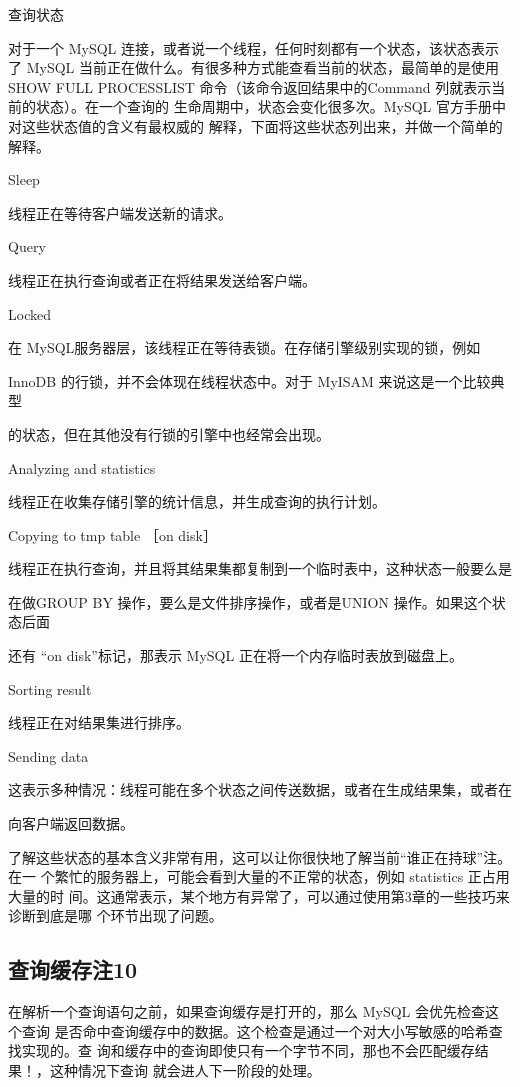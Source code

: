 查询状态

对于一个 MySQL 连接，或者说一个线程，任何时刻都有一个状态，该状态表示了
MySQL 当前正在做什么。有很多种方式能查看当前的状态，最简单的是使用 SHOW FULL
PROCESSLIST 命令（该命令返回结果中的Command 列就表示当前的状态）。在一个查询的
生命周期中，状态会变化很多次。MySQL 官方手册中对这些状态值的含义有最权威的
解释，下面将这些状态列出来，并做一个简单的解释。

Sleep

线程正在等待客户端发送新的请求。

Query

线程正在执行查询或者正在将结果发送给客户端。

Locked

在 MySQL服务器层，该线程正在等待表锁。在存储引擎级别实现的锁，例如

InnoDB 的行锁，并不会体现在线程状态中。对于 MyISAM 来说这是一个比较典型

的状态，但在其他没有行锁的引擎中也经常会出现。

Analyzing and statistics

线程正在收集存储引擎的统计信息，并生成查询的执行计划。

Copying to tmp table ［on disk］

线程正在执行查询，并且将其结果集都复制到一个临时表中，这种状态一般要么是

在做GROUP BY 操作，要么是文件排序操作，或者是UNION 操作。如果这个状态后面

还有 “on disk”标记，那表示 MySQL 正在将一个内存临时表放到磁盘上。

Sorting result

线程正在对结果集进行排序。

Sending data

这表示多种情况：线程可能在多个状态之间传送数据，或者在生成结果集，或者在

向客户端返回数据。

了解这些状态的基本含义非常有用，这可以让你很快地了解当前“谁正在持球”注。在一
个繁忙的服务器上，可能会看到大量的不正常的状态，例如 statistics 正占用大量的时
间。这通常表示，某个地方有异常了，可以通过使用第3章的一些技巧来诊断到底是哪
个环节出现了问题。

\subsection{查询缓存注10}
在解析一个查询语句之前，如果查询缓存是打开的，那么 MySQL 会优先检查这个查询
是否命中查询缓存中的数据。这个检查是通过一个对大小写敏感的哈希查找实现的。查
询和缓存中的查询即使只有一个字节不同，那也不会匹配缓存结果！，这种情况下查询
就会进人下一阶段的处理。


